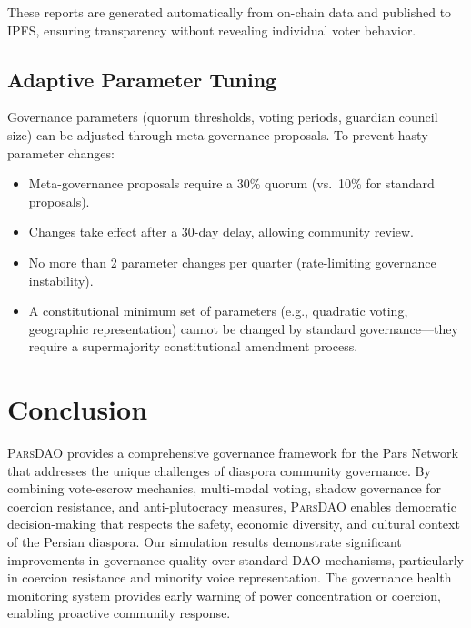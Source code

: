 \documentclass[11pt,a4paper]{article}
\newcommand{\parsdao}{\textsc{ParsDAO}\xspace}
\begin{document}
These reports are generated automatically from on-chain data and published to IPFS, ensuring transparency without revealing individual voter behavior.

\subsection{Adaptive Parameter Tuning}

Governance parameters (quorum thresholds, voting periods, guardian council size) can be adjusted through meta-governance proposals. To prevent hasty parameter changes:

\begin{itemize}
    \item Meta-governance proposals require a 30\% quorum (vs.\ 10\% for standard proposals).
    \item Changes take effect after a 30-day delay, allowing community review.
    \item No more than 2 parameter changes per quarter (rate-limiting governance instability).
    \item A constitutional minimum set of parameters (e.g., quadratic voting, geographic representation) cannot be changed by standard governance---they require a supermajority constitutional amendment process.
\end{itemize}

\section{Conclusion}

\parsdao provides a comprehensive governance framework for the Pars Network that addresses the unique challenges of diaspora community governance. By combining vote-escrow mechanics, multi-modal voting, shadow governance for coercion resistance, and anti-plutocracy measures, \parsdao enables democratic decision-making that respects the safety, economic diversity, and cultural context of the Persian diaspora. Our simulation results demonstrate significant improvements in governance quality over standard DAO mechanisms, particularly in coercion resistance and minority voice representation. The governance health monitoring system provides early warning of power concentration or coercion, enabling proactive community response.


\end{document}
